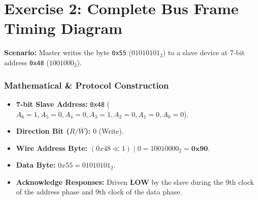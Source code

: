 \documentclass[11pt,a4paper]{article}
\begin{document}
\newpage
\section*{Exercise 2: Complete Bus Frame Timing Diagram}
\textbf{Scenario:} Master writes the byte \texttt{0x55} ($01010101_2$) to a slave device at 7-bit address \texttt{0x48} ($1001000_2$).

\subsubsection*{Mathematical \& Protocol Construction}
\begin{itemize}
    \item \textbf{7-bit Slave Address:} \texttt{0x48} ($A_6=1, A_5=0, A_4=0, A_3=1, A_2=0, A_1=0, A_0=0$).
    \item \textbf{Direction Bit ($R/\overline{W}$):} $0$ (Write).
    \item \textbf{Wire Address Byte:} $(0x48 \ll 1) \;|\; 0 = 10010000_2 = \mathbf{0x90}$.
    \item \textbf{Data Byte:} $0x55 = 01010101_2$.
    \item \textbf{Acknowledge Responses:} Driven \textbf{LOW} by the slave during the 9th clock of the address phase and 9th clock of the data phase.
\end{itemize}
\end{document}
